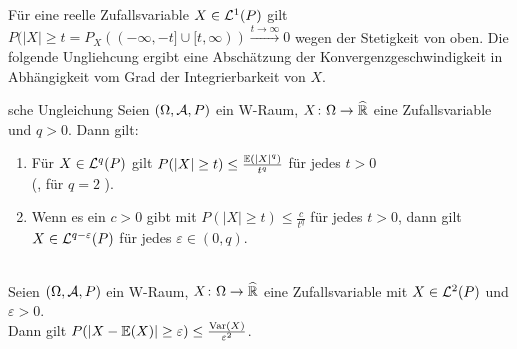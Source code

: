 \linie

\begin{Bem}
    Für eine reelle Zufallsvariable $X \in \mathcal{L}^1(P)$ gilt\\
    $P(|X| \ge t = P_X((-\infty, -t] \cup [t, \infty)) \xrightarrow{t \to \infty} 0$
    wegen der Stetigkeit von oben.
    Die folgende Ungliehcung ergibt eine Abschätzung der Konvergenzgeschwindigkeit in Abhängigkeit
    vom Grad der Integrierbarkeit von $X$.
\end{Bem}

\begin{Satz}{sche Ungleichung}
    Seien $(\Omega, \mathcal{A}, P)$ ein W-Raum, $X\colon \Omega \rightarrow \widehat{\mathbb{R}}$ eine Zufallsvariable
    und $q > 0$.
    Dann gilt:
    \begin{enumerate}
        \item
        Für $X \in \mathcal{L}^q(P)$ gilt $P(|X| \ge t) \le \frac{\mathbb{E}(|X|^q)}{t^q}$ für jedes $t > 0$\\
        (, für $q = 2$
        ).

        \item
        Wenn es ein $c > 0$ gibt mit $P(|X| \ge t) \le \frac{c}{t^q}$ für jedes $t > 0$,
        dann gilt $X \in \mathcal{L}^{q - \varepsilon}(P)$ für jedes $\varepsilon \in (0, q)$.
    \end{enumerate}
\end{Satz}

\begin{Kor}\\
    Seien $(\Omega, \mathcal{A}, P)$ ein W-Raum, $X\colon \Omega \rightarrow \widehat{\mathbb{R}}$ eine Zufallsvariable
    mit $X \in \mathcal{L}^2(P)$ und $\varepsilon > 0$.\\
    Dann gilt $P(|X - \mathbb{E}(X)| \ge \varepsilon) \le \frac{\text{Var}(X)}{\varepsilon^2}$.
\end{Kor}

\pagebreak
